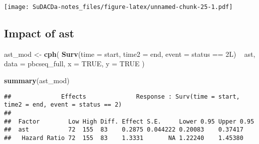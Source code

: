 \documentclass[]{book}
\newenvironment{Shaded}{\begin{snugshade}}{\end{snugshade}}
\newcommand{\KeywordTok}[1]{\textcolor[rgb]{0.13,0.29,0.53}{\textbf{{#1}}}}
\newcommand{\DataTypeTok}[1]{\textcolor[rgb]{0.13,0.29,0.53}{{#1}}}
\newcommand{\StringTok}[1]{\textcolor[rgb]{0.31,0.60,0.02}{{#1}}}
\newcommand{\OtherTok}[1]{\textcolor[rgb]{0.56,0.35,0.01}{{#1}}}
\newcommand{\NormalTok}[1]{{#1}}
\theoremstyle{definition}
\theoremstyle{definition}
\theoremstyle{definition}
\theoremstyle{remark}
\begin{document}
\begin{Shaded}
\end{Shaded}

\texttt{[image: SuDACDa-notes\_files/figure-latex/unnamed-chunk-25-1.pdf]}

\subsection{Impact of ast}\label{ast_full2}

\begin{Shaded}
\begin{Highlighting}[]
\NormalTok{ast_mod <-}\StringTok{ }\KeywordTok{cph}\NormalTok{(}
  \KeywordTok{Surv}\NormalTok{(}\DataTypeTok{time =} \NormalTok{start, }\DataTypeTok{time2 =} \NormalTok{end, }\DataTypeTok{event =} \NormalTok{status ==}\StringTok{ }\NormalTok{2L) ~}\StringTok{ }\NormalTok{ast,}
  \DataTypeTok{data =} \NormalTok{pbcseq_full,}
  \DataTypeTok{x    =} \OtherTok{TRUE}\NormalTok{,}
  \DataTypeTok{y    =} \OtherTok{TRUE}
\NormalTok{)}

\KeywordTok{summary}\NormalTok{(ast_mod)}
\end{Highlighting}
\end{Shaded}

\begin{verbatim}
##              Effects              Response : Surv(time = start, time2 = end, event = status == 2) 
## 
##  Factor        Low High Diff. Effect S.E.     Lower 0.95 Upper 0.95
##  ast           72  155  83    0.2875 0.044222 0.20083    0.37417   
##   Hazard Ratio 72  155  83    1.3331       NA 1.22240    1.45380
\end{verbatim}

\begin{Shaded}
\end{Shaded}
\end{document}
